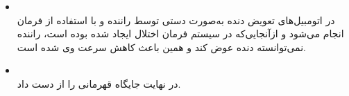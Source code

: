 \begin{qsolve}[]
\begin{enumerate}
\begin{itemize}
			\item {}\\
			در اتومبیل‌های  تعویض دنده به‌صورت دستی توسط راننده و با استفاده از فرمان انجام می‌شود و ازآنجایی‌که در سیستم فرمان اختلال ایجاد شده بوده است، راننده نمی‌توانسته دنده عوض کند و همین باعث کاهش سرعت وی شده است.
			
			\item {}\\
			در نهایت  جایگاه قهرمانی را از دست داد.
		\end{itemize}
		
	\end{enumerate}
	
\end{qsolve}